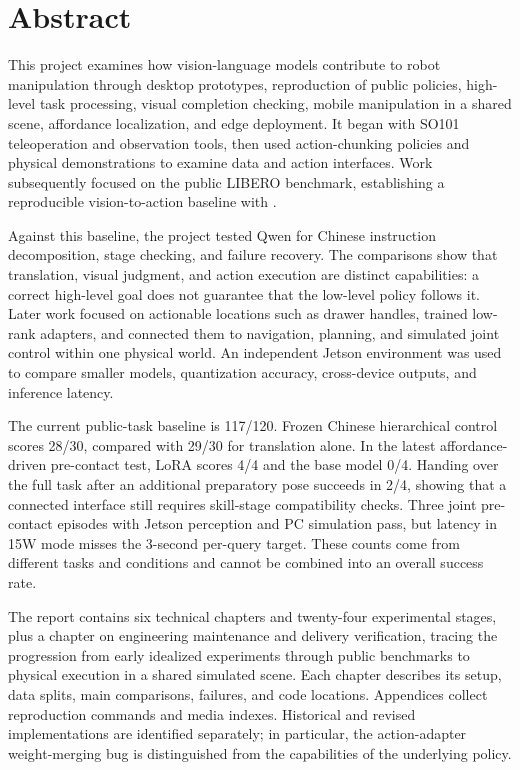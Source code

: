 \chapter*{Abstract}
This project examines how vision-language models contribute to robot manipulation through desktop prototypes, reproduction of public policies, high-level task processing, visual completion checking, mobile manipulation in a shared scene, affordance localization, and edge deployment. It began with SO101 teleoperation and observation tools, then used action-chunking policies and physical demonstrations to examine data and action interfaces. Work subsequently focused on the public LIBERO benchmark, establishing a reproducible vision-to-action baseline with \pifive{}.

Against this baseline, the project tested Qwen for Chinese instruction decomposition, stage checking, and failure recovery. The comparisons show that translation, visual judgment, and action execution are distinct capabilities: a correct high-level goal does not guarantee that the low-level policy follows it. Later work focused on actionable locations such as drawer handles, trained low-rank adapters, and connected them to navigation, planning, and simulated joint control within one physical world. An independent Jetson environment was used to compare smaller models, quantization accuracy, cross-device outputs, and inference latency.

The current \pifive{} public-task baseline is 117/120. Frozen Chinese hierarchical control scores 28/30, compared with 29/30 for translation alone. In the latest affordance-driven pre-contact test, LoRA scores 4/4 and the base model 0/4. Handing over the full task after an additional preparatory pose succeeds in 2/4, showing that a connected interface still requires skill-stage compatibility checks. Three joint pre-contact episodes with Jetson perception and PC simulation pass, but latency in 15W mode misses the 3-second per-query target. These counts come from different tasks and conditions and cannot be combined into an overall success rate.

The report contains six technical chapters and twenty-four experimental stages, plus a chapter on engineering maintenance and delivery verification, tracing the progression from early idealized experiments through public benchmarks to physical execution in a shared simulated scene. Each chapter describes its setup, data splits, main comparisons, failures, and code locations. Appendices collect reproduction commands and media indexes. Historical and revised implementations are identified separately; in particular, the action-adapter weight-merging bug is distinguished from the capabilities of the underlying policy.

